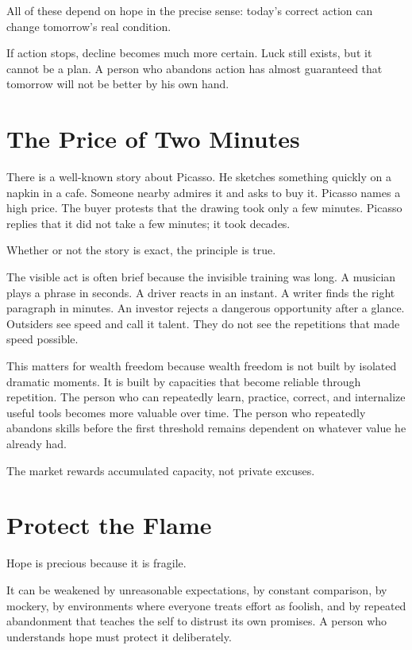 All of these depend on hope in the precise sense: today's correct action can change tomorrow's real condition.

If action stops, decline becomes much more certain. Luck still exists, but it cannot be a plan. A person who abandons action has almost guaranteed that tomorrow will not be better by his own hand.

\section*{The Price of Two Minutes}

There is a well-known story about Picasso. He sketches something quickly on a napkin in a cafe. Someone nearby admires it and asks to buy it. Picasso names a high price. The buyer protests that the drawing took only a few minutes. Picasso replies that it did not take a few minutes; it took decades.

Whether or not the story is exact, the principle is true.

The visible act is often brief because the invisible training was long. A musician plays a phrase in seconds. A driver reacts in an instant. A writer finds the right paragraph in minutes. An investor rejects a dangerous opportunity after a glance. Outsiders see speed and call it talent. They do not see the repetitions that made speed possible.

This matters for wealth freedom because wealth freedom is not built by isolated dramatic moments. It is built by capacities that become reliable through repetition. The person who can repeatedly learn, practice, correct, and internalize useful tools becomes more valuable over time. The person who repeatedly abandons skills before the first threshold remains dependent on whatever value he already had.

The market rewards accumulated capacity, not private excuses.

\section*{Protect the Flame}

Hope is precious because it is fragile.

It can be weakened by unreasonable expectations, by constant comparison, by mockery, by environments where everyone treats effort as foolish, and by repeated abandonment that teaches the self to distrust its own promises. A person who understands hope must protect it deliberately.

